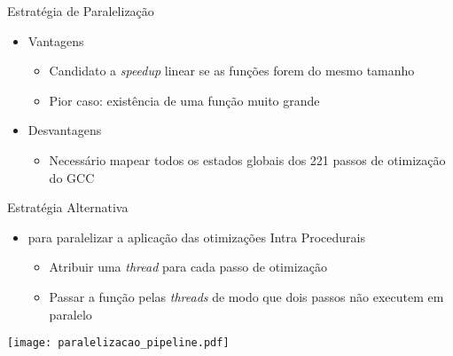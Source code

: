 \begin{frame}{Estratégia de Paralelização}
    \begin{itemize}
        \item Vantagens
            \begin{itemize}
                \item Candidato a \textit{speedup} linear se as funções forem do mesmo tamanho
                \item Pior caso: existência de uma função muito grande
            \end{itemize}
        \item Desvantagens
            \begin{itemize}
                \item Necessário mapear todos os estados globais dos 221 passos de otimização do GCC
            \end{itemize}

    \end{itemize}
\end{frame}


\begin{frame}{Estratégia Alternativa}
    \begin{itemize}
        \item {\color{blue}{Estratégia alternativa}} para paralelizar a aplicação das otimizações Intra Procedurais
            \begin{itemize}
                \item Atribuir uma \textit{thread} para cada passo de otimização
                \item Passar a função pelas \textit{threads} de modo que dois passos não executem em paralelo
            \end{itemize}
    \end{itemize}

 \centering
 \texttt{[image: paralelizacao\_pipeline.pdf]}
\end{frame}

